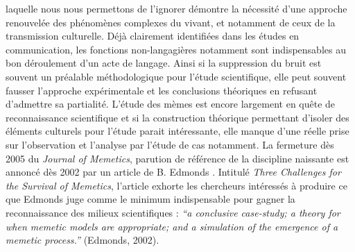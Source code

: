laquelle nous nous permettons de l{\textquoteright}ignorer d\'emontre la n\'ecessit\'e d{\textquoteright}une approche renouvel\'ee des ph\'enom\`enes complexes du vivant, et notamment de ceux de la transmission culturelle. D\'ej\`a clairement identifi\'ees dans les \'etudes en communication, les fonctions non-langagi\`eres notamment sont indispensables au bon d\'eroulement d{\textquoteright}un acte de langage. Ainsi si la suppression du bruit est souvent un pr\'ealable m\'ethodologique pour l{\textquoteright}\'etude scientifique, elle peut souvent fausser l{\textquoteright}approche exp\'erimentale et les conclusions th\'eoriques en refusant d{\textquoteright}admettre sa partialit\'e. L{\textquoteright}\'etude des m\`emes est encore largement en qu\^ete de reconnaissance scientifique et si la construction th\'eorique permettant d{\textquoteright}isoler des \'el\'ements culturels pour l{\textquoteright}\'etude parait int\'eressante, elle manque d{\textquoteright}une r\'eelle prise sur l{\textquoteright}observation et l{\textquoteright}analyse par l{\textquoteright}\'etude de cas notamment. La fermeture d\`es 2005 du \textit{Journal of Memetics}, parution de r\'ef\'erence de la discipline naissante est annonc\'e d\`es 2002 par un article de B. Edmonds \cite{Jouxtel2014}. Intitul\'e \textit{Three Challenges for the Survival of Memetics}, l{\textquoteright}article\textit{ }exhorte les chercheurs int\'eress\'es \`a produire ce que Edmonds juge comme le minimum indispensable pour gagner la reconnaissance des milieux scientifiques : \textit{{\textquotedblleft}a conclusive case-study; a theory for when memetic models are appropriate; and a simulation of the emergence of a memetic process.{\textquotedblright}} (Edmonds, 2002).  
